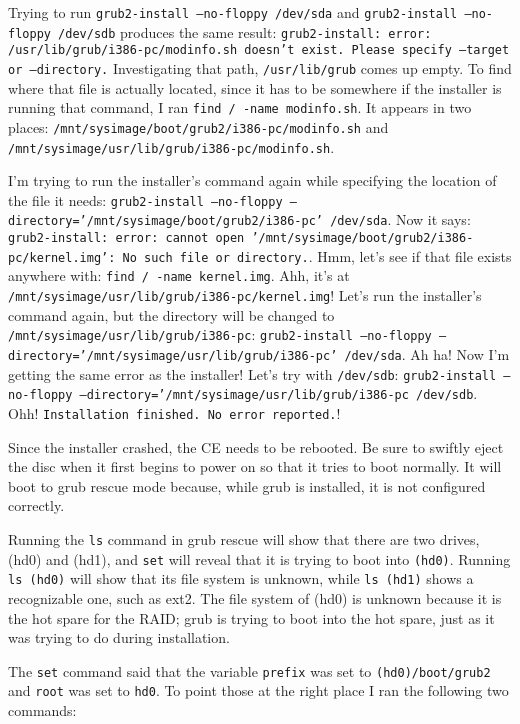 \documentclass[12pt]{article}
\begin{document}
\qq Trying to run {\tt grub2-install --no-floppy /dev/sda} and {\tt grub2-install
  --no-floppy /dev/sdb} produces the same result: {\tt grub2-install: error:
  /usr/lib/grub/i386-pc/modinfo.sh doesn't exist. Please specify --target or
  --directory.} Investigating that path, {\tt /usr/lib/grub} comes up empty. To
find where that file is actually located, since it has to be somewhere if the
installer is running that command, I ran {\tt find / -name modinfo.sh}. It
appears in two places: {\tt /mnt/sysimage/boot/grub2/i386-pc/modinfo.sh} and
{\tt /mnt/sysimage/usr/lib/grub/i386-pc/modinfo.sh}.

\qq I'm trying to run the installer's command again while specifying the
location of the file it needs: {\tt grub2-install --no-floppy
  --directory='/mnt/sysimage/boot/grub2/i386-pc' /dev/sda}. Now it says:
{\tt grub2-install: error: cannot open
  '/mnt/sysimage/boot/grub2/i386-pc/kernel.img': No such file or
  directory.}. Hmm, let's see if that file exists anywhere with: {\tt find /
  -name kernel.img}. Ahh, it's at
{\tt /mnt/sysimage/usr/lib/grub/i386-pc/kernel.img}! Let's run the installer's
command again, but the directory will be changed to
{\tt /mnt/sysimage/usr/lib/grub/i386-pc}:
{\tt grub2-install --no-floppy --directory='/mnt/sysimage/usr/lib/grub/i386-pc'
  /dev/sda}. Ah ha! Now I'm getting the same error as the installer! Let's try
with {\tt /dev/sdb}: {\tt grub2-install --no-floppy
  --directory='/mnt/sysimage/usr/lib/grub/i386-pc /dev/sdb}. Ohh!
{\tt Installation finished. No error reported.}! 

\qq Since the installer crashed, the CE needs to be rebooted. Be sure to swiftly
eject the disc when it first begins to power on so that it tries to boot
normally. It will boot to grub rescue mode because, while grub is installed, it
is not configured correctly.

\qq Running the {\tt ls} command in grub rescue will show that there are two
drives, (hd0) and (hd1), and {\tt set} will reveal that it is trying to boot into
{\tt (hd0)}. Running {\tt ls (hd0)} will show that its file system is unknown,
while {\tt ls (hd1)} shows a recognizable one, such as ext2. The file system of
(hd0) is unknown because it is the hot spare for the RAID; grub is trying to
boot into the hot spare, just as it was trying to do during installation.

\qq The {\tt set} command said that the variable {\tt prefix} was set to
{\tt (hd0)/boot/grub2} and {\tt root} was set to {\tt hd0}. To point those at the
right place I ran the following two commands:
\end{document}
